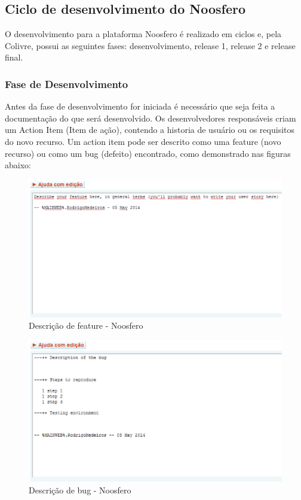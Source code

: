 \subsection{Ciclo de desenvolvimento do Noosfero}
%
O desenvolvimento para a plataforma Noosfero é realizado em ciclos e, pela Colivre, 
possui as seguintes fases: desenvolvimento, release 1, release 2 e release final.
%
\subsubsection{Fase de Desenvolvimento}
%
Antes da fase de desenvolvimento for iniciada é necessário que seja feita a 
documentação do que será desenvolvido. Os desenvolvedores responsáveis criam um 
Action Item (Item de ação), contendo a historia de usuário ou os requisitos do novo 
recurso. Um action item pode ser descrito como uma feature (novo recurso) ou como 
um bug (defeito) encontrado, como demonstrado nas figuras abaixo:%
%
\begin{figure}[!h]
    \centering
    \includegraphics[keepaspectratio=true,scale=0.65]
      {figuras/noosfero_feature.eps}
    \caption{Descrição de feature - Noosfero}
    \label{noosfero_feature}
\end{figure}
%
\begin{figure}[!h]
    \centering
    \includegraphics[keepaspectratio=true,scale=0.65]
      {figuras/noosfero_bug.eps}
    \caption{Descrição de bug - Noosfero}
    \label{noosfero_bug}
\end{figure}

